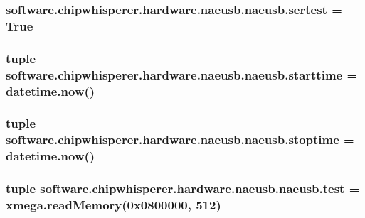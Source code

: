 \subsubsection[{sertest}]{\setlength{\rightskip}{0pt plus 5cm}software.\+chipwhisperer.\+hardware.\+naeusb.\+naeusb.\+sertest = True}\label{namespacesoftware_1_1chipwhisperer_1_1hardware_1_1naeusb_1_1naeusb_a3d4045cbc3287c2f337d55bad870e5ec}
\hypertarget{namespacesoftware_1_1chipwhisperer_1_1hardware_1_1naeusb_1_1naeusb_a4adf2b4ac902727d07ae761d547b4d62}{}
\subsubsection[{starttime}]{\setlength{\rightskip}{0pt plus 5cm}tuple software.\+chipwhisperer.\+hardware.\+naeusb.\+naeusb.\+starttime = datetime.\+now()}\label{namespacesoftware_1_1chipwhisperer_1_1hardware_1_1naeusb_1_1naeusb_a4adf2b4ac902727d07ae761d547b4d62}
\hypertarget{namespacesoftware_1_1chipwhisperer_1_1hardware_1_1naeusb_1_1naeusb_a70293c25c54b266d7f1f5179f6bed7f1}{}
\subsubsection[{stoptime}]{\setlength{\rightskip}{0pt plus 5cm}tuple software.\+chipwhisperer.\+hardware.\+naeusb.\+naeusb.\+stoptime = datetime.\+now()}\label{namespacesoftware_1_1chipwhisperer_1_1hardware_1_1naeusb_1_1naeusb_a70293c25c54b266d7f1f5179f6bed7f1}
\hypertarget{namespacesoftware_1_1chipwhisperer_1_1hardware_1_1naeusb_1_1naeusb_a838ea91a48030ed657fbae2aee627afc}{}
\subsubsection[{test}]{\setlength{\rightskip}{0pt plus 5cm}tuple software.\+chipwhisperer.\+hardware.\+naeusb.\+naeusb.\+test = xmega.\+read\+Memory(0x0800000, 512)}\label{namespacesoftware_1_1chipwhisperer_1_1hardware_1_1naeusb_1_1naeusb_a838ea91a48030ed657fbae2aee627afc}
\hypertarget{namespacesoftware_1_1chipwhisperer_1_1hardware_1_1naeusb_1_1naeusb_a718d6db4be65b5c05643f40c26113f20}{}
